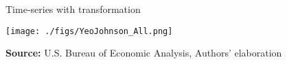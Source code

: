 \documentclass[12pt, a4paper]{article}
\begin{document}
\begin{figure}[htb]
	\centering
	\caption{Time-series with \textcite{yeo_new_2000} transformation}
	\label{YeoJhonson}
	\texttt{[image: ./figs/YeoJohnson\_All.png]}
	\caption*{\textbf{Source:} U.S. Bureau of Economic Analysis, Authors' elaboration}
\end{figure}






\end{document}
